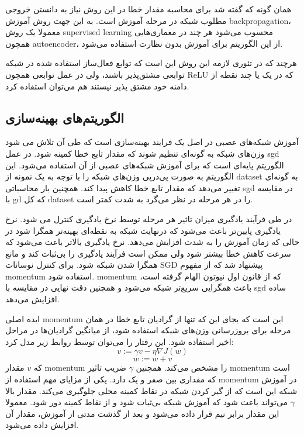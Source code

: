 همان گونه که گفته شد برای محاسبه مقدار خطا در این روش نیاز به دانستن خروجی مطلوب
شبکه در مرحله آموزش است. به این جهت روش آموزش \gls{backpropagation}، معمولا یک
روش \gls{supervised learning} محسوب می‌شود هر چند در معماری‌هایی همچون
\gls{autoencoder}، از این الگوریتم برای آموزش بدون نظارت استفاده می‌شود.

هرچند که در تئوری لازمه این روش این است که توابع فعال‌ساز استفاده شده در شبکه
توابعی مشتق‌پذیر باشند، ولی در عمل توابعی همچون ReLU که در یک یا چند نقطه از
دامنه خود مشتق پذیر نیستند هم می‌توان استفاده کرد.

\subsection{الگوریتم‌های بهینه‌سازی}
آموزش شبکه‌های عصبی در اصل یک فرایند بهینه‌سازی است که طی آن تلاش می شود وزن‌های
شبکه به گونه‌ای تنظیم شوند که مقدار تابع خطا کمینه شود. در عمل \gls{sgd}
الگوریتم پایه‌ای است که برای آموزش شبکه‌های عصبی از آن استفاده می‌شود. این
الگوریتم به صورت پی‌درپی وزن‌های شبکه را با توجه به یک نمونه از \gls{dataset} به
گونه‌ای تغییر می‌دهد که مقدار تابع خطا کاهش پیدا کند. همچنین بار محاسباتی
\gls{sgd} در مقایسه با \gls{gd} که کل \gls{dataset} را در هر مرحله در نظر
می‌گرد به شدت کمتر است.

در طی فرآیند یادگیری میزان تاثیر هر مرحله توسط نرخ یادگیری کنترل می شود. نرخ
یادگیری پایین‌تر باعث می‌شود که درنهایت شبکه به نقطه‌ای بهینه‌تر همگرا شود در
حالی که زمان آموزش را به شدت افزایش می‌دهد. نرخ یادگیری بالاتر باعث می‌شود که
سرعت کاهش خطا بیشتر شود ولی ممکن است فرآیند یادگیری را بی‌ثبات کند و مانع همگرا
شدن شبکه شود. برای کنترل نوسانات \gls{SGD} پیشنهاد شد که از مفهوم \gls{momentum}
استفاده شود. \gls{momentum} که از قانون اول نیوتون الهام گرفته است، باعث همگرایی
سریع‌تر شبکه می‌شود و همچنین دقت نهایی در مقایسه با \gls{sgd} ساده افزایش می‌دهد.

ایده اصلی \gls{momentum} این است که بجای این که تنها از گرادیان تابع خطا در همان
مرحله برای بروزرسانی وزن‌های شبکه استفاده شود، از میانگین گرادیان‌ها در مراحل
اخیر استفاده شود. این رفتار را می‌توان توسط روابط زیر مدل کرد:
\begin{equation}
    v := \gamma v - \eta \nabla J(w)
\end{equation}
\begin{equation}
    w := w + v
\end{equation}
که $v$ مقدار \gls{momentum} را مشخص می‌کند. همچنین $\gamma$ ضریب تاثیر
\gls{momentum} است که مقداری بین صفر و یک دارد. یکی از مزایای مهم استفاده از
\gls{momentum} در آموزش شبکه این است که از گیر کردن شبکه در نقاط کمینه محلی
جلوگیری می‌کند. مقدار بالا $\gamma$ می‌تواند باعث شود که آموزش شبکه بی‌ثبات شود
و از نقاط کمینه دور شود. معمولا این مقدار برابر نیم قرار داده می‌شود و بعد از
گذشت مدتی از آموزش، مقدار آن افزایش داده می‌شود.

